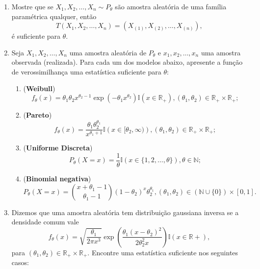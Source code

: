 \documentclass[a4paper,10pt, notitlepage]{report}
\newcommand{\rs}{X_1, X_2, \ldots, X_n} %
\newcommand{\rsd}{x_1, x_2, \ldots, x_n} %
\newcommand{\rpl}{\mathbb{R}_+}
\begin{document}
\begin{enumerate}
    \item Mostre que se $\rs \sim P_\theta$ são amostra aleatória de uma família paramétrica qualquer, então
    $$T(\rs) = (X_{(1)}, X_{(2)}, \ldots, X_{(n)}),$$
    é suficiente para $\theta$.
    \item Seja $\rs$ uma amostra aleatória de $P_\theta$ e $\rsd$ uma amostra observada (realizada).
    Para cada um dos modelos abaixo, apresente a função de verossimilhança uma estatística suficiente para $\theta$:
    \begin{enumerate}
        \item (\textbf{Weibull})
        \begin{equation*}
            f_\theta(x) = \theta_1\theta_2 x^{\theta_2-1}\exp\left(-\theta_1 x^{\theta_2}\right)\mathbb{I}(x \in \rpl), (\theta_1, \theta_2) \in \rpl \times \rpl;
        \end{equation*}
        \item (\textbf{Pareto}) 
        \begin{equation*}
            f_\theta(x) = \frac{\theta_1\theta_2^{\theta_1}}{x^{\theta_1 + 1}}\mathbb{I}\left(x \in [\theta_2, \infty)\right), (\theta_1, \theta_2) \in \rpl \times \rpl;
        \end{equation*}
        \item (\textbf{Uniforme Discreta})
        \begin{equation*}
            P_\theta(X = x) = \frac{1}{\theta}\mathbb{I}(x \in \{1, 2, \ldots,\theta\}), \theta \in \mathbb{N};
        \end{equation*}
        \item (\textbf{Binomial negativa})
        \begin{equation*}
            P_\theta(X = x) = \binom{x + \theta_1 - 1}{\theta_1-1}(1-\theta_2)^x \theta_2^{\theta_1}, (\theta_1, \theta_2) \in (\mathbb{N} \cup \{0\}) \times [0, 1].
        \end{equation*}
    \end{enumerate}
    \item Dizemos que uma amostra aleatória tem distribuição gaussiana inversa se a densidade comum vale
    \begin{equation*}
        f_\theta(x) = \sqrt{\frac{\theta_1}{2\pi x^3}} \exp\left(\frac{\theta_1(x-\theta_2)^2}{2\theta_2^2x}\right)\mathbb{I}(x \in \mathbb{R}+),
    \end{equation*}
    para $(\theta_1, \theta_2) \in \rpl \times \mathbb{R}_{+}$.
    Encontre uma estatística suficiente nos seguintes casos:

\end{enumerate}
\end{document}
